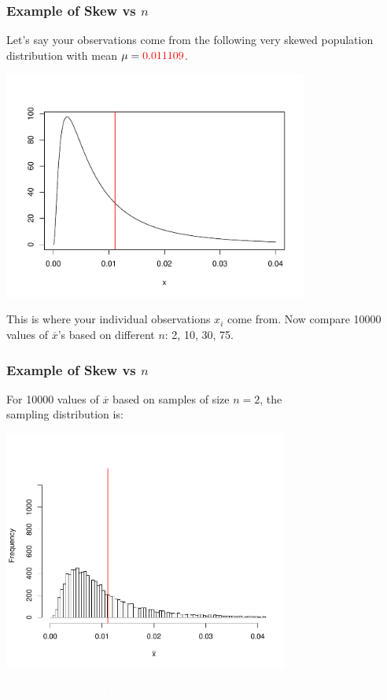 \documentclass[slides]{beamer}
\newcommand{\blue}[1]{\textcolor{blue2}{#1}}
\newcommand{\white}[1]{\textcolor{white}{#1}}
\newcommand{\xbar}{\overline{x}}
\begin{document}
\begin{frame}
\frametitle{Example of Skew vs $n$}
Let's say your observations come from the following very skewed \blue{population distribution} with mean $\mu=\textcolor{red}{0.011109}$. 
\begin{center}
\pause\includegraphics[width=0.75\textwidth]{figure/true.pdf}
\end{center}
\pause  This is where your individual observations $x_i$ come from.  \pause Now compare 10000 values of $\xbar$'s based on different $n$:  2, 10, 30, 75.   
\end{frame}


\begin{frame}
\frametitle{Example of Skew vs $n$}
For 10000 values of $\xbar$ based on samples of size \blue{$n=2$}, the\\
sampling distribution is:
\begin{center}
\includegraphics[width=0.7\textwidth]{figure/hist2.pdf}
\end{center}
\white{i.e. more normal and more narrow}
\end{frame}
\end{document}
